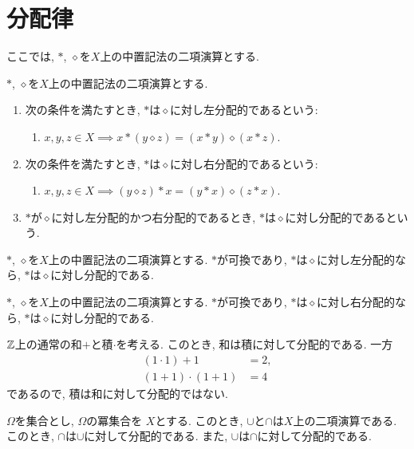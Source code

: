\section{分配律}
ここでは, $\ast$, $\diamond$を$X$上の中置記法の二項演算とする.
\begin{definition}
  $\ast$, $\diamond$を$X$上の中置記法の二項演算とする.
  \begin{enumerate}
  \item 次の条件を満たすとき,
    $\ast$は$\diamond$に対し左分配的であるという:
    \begin{enumerate}
      \item $x,y,z\in X \implies x\ast (y\diamond z)=(x\ast y)\diamond (x\ast z)$.
    \end{enumerate}
  \item 次の条件を満たすとき,
    $\ast$は$\diamond$に対し右分配的であるという:
    \begin{enumerate}
      \item $x,y,z\in X \implies (y\diamond z) \ast x=(y\ast x)\diamond (z\ast x)$.
    \end{enumerate}
  \item 
    $\ast$が$\diamond$に対し左分配的かつ右分配的であるとき,
    $\ast$は$\diamond$に対し分配的であるという.
  \end{enumerate}
\end{definition}

\begin{cor}
  $\ast$, $\diamond$を$X$上の中置記法の二項演算とする.
  $\ast$が可換であり,
  $\ast$は$\diamond$に対し左分配的なら,
  $\ast$は$\diamond$に対し分配的である.
\end{cor}
\begin{cor}
  $\ast$, $\diamond$を$X$上の中置記法の二項演算とする.
  $\ast$が可換であり,
  $\ast$は$\diamond$に対し右分配的なら,
  $\ast$は$\diamond$に対し分配的である.
\end{cor}
\begin{example}
  $\mathbb{Z}$上の通常の和$+$と積$\cdot$を考える.
  このとき, 和は積に対して分配的である.
  一方
  \begin{align*}
    (1\cdot 1)+1&=2,\\
    (1+1)\cdot(1+1)&=4
  \end{align*}
  であるので, 積は和に対して分配的ではない.
\end{example}
\begin{example}
  $\Omega$を集合とし,
  $\Omega$の冪集合を
  $X$とする.
  このとき,
  $\cup$と$\cap$は$X$上の二項演算である.
  このとき,
  $\cap$は$\cup$に対して分配的である.
  また,
  $\cup$は$\cap$に対して分配的である.
\end{example}

